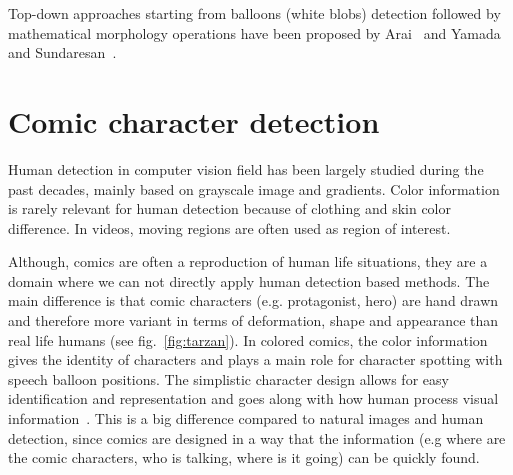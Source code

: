 Top-down approaches starting from balloons (white blobs) detection followed by mathematical morphology operations have been proposed by Arai~\cite{Arai11} and Yamada~\cite{Yam04} and Sundaresan~\cite{Sundaresan2012Text}.



\section{Comic character detection}
\label{sec:sota:comic_character}



Human detection in computer vision field has been largely studied during the past decades, mainly based on grayscale image and gradients. Color information is rarely relevant for human detection because of clothing and skin color difference. In videos, moving regions are often used as region of interest.

Although, comics are often a reproduction of human life situations, they are a domain where we can not directly apply human detection based methods.
The main difference is that comic characters (e.g. protagonist, hero) are hand drawn and therefore more variant in terms of deformation, shape and appearance than real life humans (see fig.~\ref{fig:tarzan}).
In colored comics, the color information gives the identity of characters and plays a main role for character spotting with speech balloon positions. 
The simplistic character design allows for easy identification and representation and goes along with how human process visual information~\cite{ahmadimpactsOfManga,medley2010discerningPictures,cohn2010limits}.
This is a big difference compared to natural images and human detection, since comics are designed in a way that the information (e.g where are the comic characters, who is talking, where is it going) can be quickly found.%


